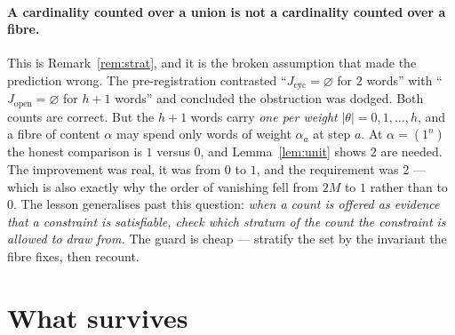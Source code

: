 \documentclass[11pt]{article}
\theoremstyle{plain}
\theoremstyle{definition}
\newcommand{\Jop}{J_{\mathrm{open}}}
\newcommand{\Jcyc}{J_{\mathrm{cyc}}}
\begin{document}
\paragraph{A cardinality counted over a union is not a cardinality counted over a fibre.} This is
Remark~\ref{rem:strat}, and it is the broken assumption that made the prediction wrong. The
pre-registration contrasted ``$\Jcyc=\varnothing$ for $2$ words'' with ``$\Jop=\varnothing$ for
$h+1$ words'' and concluded the obstruction was dodged. Both counts are correct. But the $h+1$
words carry \emph{one per weight} $|\theta|=0,1,\dots,h$, and a fibre of content $\alpha$ may
spend only words of weight $\alpha_a$ at step $a$. At $\alpha=(1^n)$ the honest comparison is
$1$ versus $0$, and Lemma~\ref{lem:unit} shows $2$ are needed. The improvement was real,
it was from $0$ to $1$, and the requirement was $2$ --- which is also exactly why the order of
vanishing fell from $2M$ to $1$ rather than to $0$.
The lesson generalises past this question: \emph{when a count is offered as evidence that a
constraint is satisfiable, check which stratum of the count the constraint is allowed to draw
from.} The guard is cheap --- stratify the set by the invariant the fibre fixes, then recount.

\section{What survives}
\end{document}
